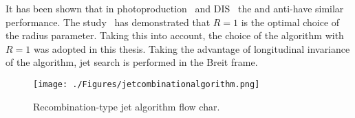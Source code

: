  It has been shown that in photoproduction~\cite{pub:incljetphp} and DIS~\cite{pub:claudia} the \kt and anti-\kt have similar performance. The study~\cite{pub:jetradius} has demonstrated that $R=1$ is the optimal choice of the radius parameter. Taking this into account, the choice of the \kt algorithm with $R=1$ was adopted in this thesis. Taking the advantage of longitudinal invariance of the algorithm, jet search is performed in the Breit frame.

\begin{figure}
	\centering
		\texttt{[image: ./Figures/jetcombinationalgorithm.png]}
	\caption{Recombination-type jet algorithm flow char.}
	\label{fig:jetcombinationalgorithm}
\end{figure}
